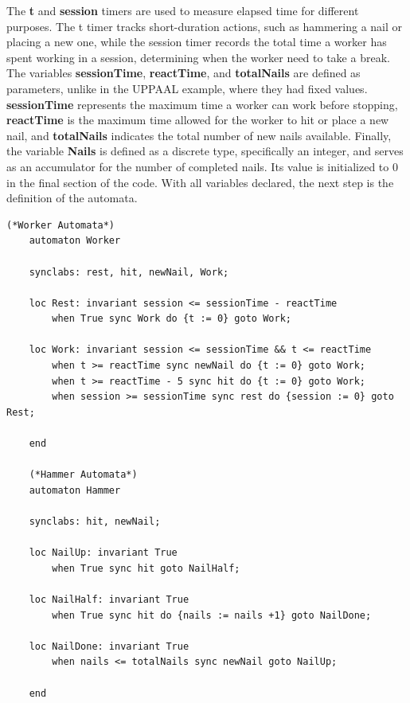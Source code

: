 The \textbf{t} and \textbf{session} timers are used to measure elapsed time for different purposes. The t timer tracks short-duration actions, such as hammering a nail or placing a new one, while the session timer records the total time a worker has spent working in a session, determining when the worker need to take a break. The variables \textbf{sessionTime}, \textbf{reactTime}, and \textbf{totalNails} are defined as parameters, unlike in the UPPAAL example, where they had fixed values. \textbf{sessionTime} represents the maximum time a worker can work before stopping, \textbf{reactTime} is the maximum time allowed for the worker to hit or place a new nail, and \textbf{totalNails} indicates the total number of new nails available. Finally, the variable \textbf{Nails} is defined as a discrete type, specifically an integer, and serves as an accumulator for the number of completed nails. Its value is initialized to 0 in the final section of the code. With all variables declared, the next step is the definition of the automata.

\begin{lstlisting}[language=UPPAAL]
    (*Worker Automata*)
    automaton Worker
    
    synclabs: rest, hit, newNail, Work;
    
    loc Rest: invariant session <= sessionTime - reactTime
      	when True sync Work do {t := 0} goto Work;
    
    loc Work: invariant session <= sessionTime && t <= reactTime
      	when t >= reactTime sync newNail do {t := 0} goto Work;
      	when t >= reactTime - 5 sync hit do {t := 0} goto Work;
      	when session >= sessionTime sync rest do {session := 0} goto Rest;
    
    end
    
    (*Hammer Automata*)
    automaton Hammer
    
    synclabs: hit, newNail;
    
    loc NailUp: invariant True
      	when True sync hit goto NailHalf;
    
    loc NailHalf: invariant True
      	when True sync hit do {nails := nails +1} goto NailDone;
    
    loc NailDone: invariant True
      	when nails <= totalNails sync newNail goto NailUp;
    
    end


\end{lstlisting}


